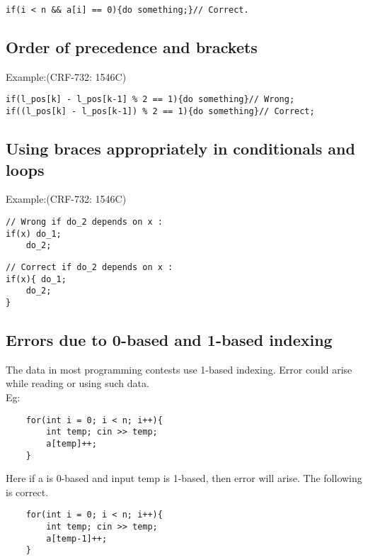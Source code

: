 \vspace{-14pt}

\begin{verbatim}
if(i < n && a[i] == 0){do something;}// Correct.
\end{verbatim}

\subsection{Order of precedence and brackets}
Example:(CRF-732: 1546C)
\begin{verbatim}
if(l_pos[k] - l_pos[k-1] % 2 == 1){do something}// Wrong;
if((l_pos[k] - l_pos[k-1]) % 2 == 1){do something}// Correct;
\end{verbatim}

\subsection{Using braces appropriately in conditionals and loops}
Example:(CRF-732: 1546C)
\begin{verbatim}
// Wrong if do_2 depends on x :
if(x) do_1;
    do_2;
\end{verbatim}


\begin{verbatim}
// Correct if do_2 depends on x :
if(x){ do_1;
    do_2;
}
\end{verbatim}


\subsection{Errors due to 0-based and 1-based indexing}
The data in most programming contests use 1-based indexing. Error could arise while reading or using such data.\\
Eg:
\begin{verbatim}
	for(int i = 0; i < n; i++){
		int temp; cin >> temp;
		a[temp]++;
	}
\end{verbatim}

Here if a is 0-based and input temp is 1-based, then error will arise. The following is correct.

\begin{verbatim}
	for(int i = 0; i < n; i++){
		int temp; cin >> temp;
		a[temp-1]++;
	}
\end{verbatim}

